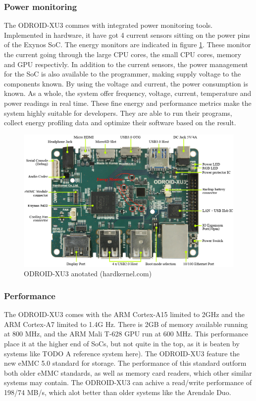 \subsubsection{Power monitoring}
The ODROID-XU3 commes with integrated power monitoring tools.
Implemented in hardware, it have got 4 current sensors sitting on the power pins of the Exynos SoC.
The energy monitors are indicated in figure \ref{overview-odroid}.
These monitor the current going through the large CPU cores, the small CPU cores, memory and GPU respectivly.
In addition to the current sensors, the power management for the SoC is also available to the programmer, making supply voltage to the components known.
By using the voltage and current, the power consumption is known.
As a whole, the system offer frequency, voltage, current, temperature and power readings in real time.
These fine energy and performance metrics make the system highly suitable for developers.
They are able to run their programs, collect energy profiling data and optimize their software based on the result.

\begin{figure}[ht!]
  \centering
  \includegraphics[width=130mm]{fig/overview-odroid.jpg}
  \caption{ODROID-XU3 anotated (hardkernel.com\cite{hardkernel01})\label{overview-odroid}}
\end{figure}

\subsubsection{Performance}

The ODROID-XU3 comes with the ARM Cortex-A15 limited to 2GHz and the ARM Cortex-A7 limited to 1.4G Hz.
There is 2GB of memory available running at 800 MHz, and the ARM Mali T-628 GPU run at 600 MHz.
This performance place it at the higher end of SoCs, but not quite in the top, as it is beaten by systems like TODO A reference system here).
The ODROID-XU3 feature the new eMMC 5.0 standard for storage.
The performance of this standard outform both older eMMC standards, as well as memory card readers, which other similar systems may contain.
The ODROID-XU3 can achive a read/write performance of 198/74 MB/s\cite{hardkernel01}, which alot better than older systems like the Arendale Duo.

